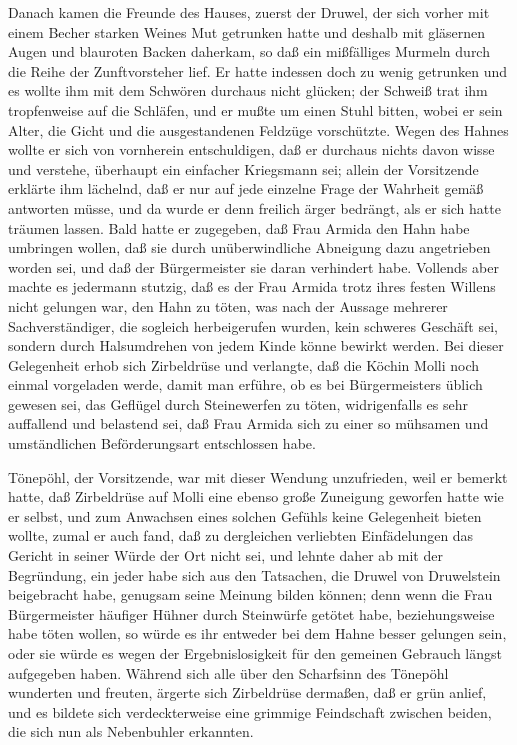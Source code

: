 Danach kamen die Freunde des Hauses, zuerst der Druwel, der sich
vorher mit einem Becher starken Weines Mut getrunken hatte und
deshalb mit gläsernen Augen und blauroten Backen daherkam, so daß
ein mißfälliges Murmeln durch die Reihe der Zunftvorsteher lief. Er
hatte indessen doch zu wenig getrunken und es wollte ihm mit dem
Schwören durchaus nicht glücken; der Schweiß trat ihm tropfenweise
auf die Schläfen, und er mußte um einen Stuhl bitten, wobei er sein
Alter, die Gicht und die ausgestandenen Feldzüge vorschützte. Wegen
des Hahnes wollte er sich von vornherein entschuldigen, daß er
durchaus nichts davon wisse und verstehe, überhaupt ein einfacher
Kriegsmann sei; allein der Vorsitzende erklärte ihm lächelnd, daß
er nur auf jede einzelne Frage der Wahrheit gemäß antworten müsse,
und da wurde er denn freilich ärger bedrängt, als er sich hatte
träumen lassen. Bald hatte er zugegeben, daß Frau Armida den Hahn
habe umbringen wollen, daß sie\pagenum{[30]} durch unüberwindliche
Abneigung dazu angetrieben worden sei, und daß der Bürgermeister
sie daran verhindert habe. Vollends aber machte es jedermann
stutzig, daß es der Frau Armida trotz ihres festen Willens nicht
gelungen war, den Hahn zu töten, was nach der Aussage mehrerer
Sachverständiger, die sogleich herbeigerufen wurden, kein schweres
Geschäft sei, sondern durch Halsumdrehen von jedem Kinde könne
bewirkt werden. Bei dieser Gelegenheit erhob sich Zirbeldrüse und
verlangte, daß die Köchin Molli noch einmal vorgeladen werde, damit
man erführe, ob es bei Bürgermeisters üblich gewesen sei, das
Geflügel durch Steinewerfen zu töten, widrigenfalls es sehr
auffallend und belastend sei, daß Frau Armida sich zu einer so
mühsamen und umständlichen Beförderungsart entschlossen habe.

Tönepöhl, der Vorsitzende, war mit dieser Wendung unzufrieden, weil
er bemerkt hatte, daß Zirbeldrüse auf Molli eine ebenso große
Zuneigung geworfen hatte wie er selbst, und zum Anwachsen eines
solchen Gefühls keine Gelegenheit bieten wollte, zumal er auch
fand, daß zu dergleichen verliebten Einfädelungen das Gericht in
seiner Würde der Ort nicht sei, und lehnte daher ab mit der
Begründung, ein jeder habe sich aus den Tatsachen, die Druwel von
Druwelstein beigebracht habe, genugsam seine Meinung bilden können;
denn wenn die Frau Bürgermeister häufiger Hühner durch Steinwürfe
getötet habe, beziehungsweise habe töten wollen, so würde es ihr
entweder bei dem Hahne besser gelungen sein, oder sie würde es
wegen der Ergebnislosigkeit für den gemeinen Gebrauch längst
aufgegeben haben. Während sich alle über den Scharfsinn des
Tönepöhl wunderten und freuten, ärgerte sich Zirbeldrüse dermaßen,
daß er grün anlief, und es bildete sich verdeckterweise eine
grimmige\pagenum{[31]} Feindschaft zwischen beiden, die sich nun
als Nebenbuhler erkannten.

